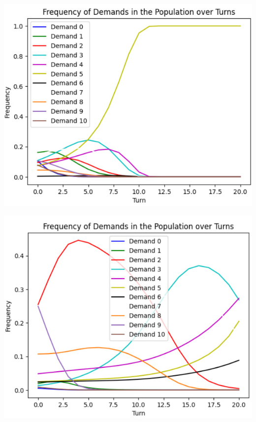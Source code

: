 \begin{center}
\includegraphics{16}
\end{center}

\begin{center}
\includegraphics{17}
\end{center}

